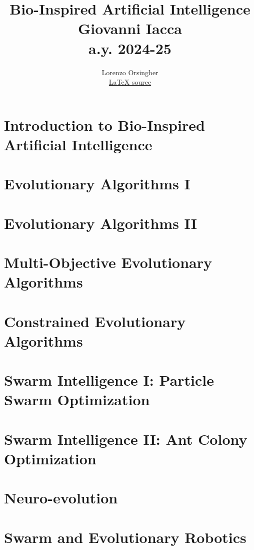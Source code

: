 \documentclass{report}
\title{\textbf{\Huge Bio-Inspired Artificial Intelligence} \\ \large Giovanni Iacca \\
\large a.y. 2024-25}
\author{Lorenzo Orsingher \\
\href{https://www.latex-project.org/}{\LaTeX{} source}
}
\date{}  %
\begin{document}
\maketitle

\tableofcontents

\chapter{Introduction to Bio-Inspired Artificial Intelligence}


\chapter{Evolutionary Algorithms I}


\chapter{Evolutionary Algorithms II}


\chapter{Multi-Objective Evolutionary Algorithms}


\chapter{Constrained Evolutionary Algorithms}


\chapter{Swarm Intelligence I: Particle Swarm Optimization}


\chapter{Swarm Intelligence II: Ant Colony Optimization}


\chapter{Neuro-evolution}


\chapter{Swarm and Evolutionary Robotics}

\end{document}
